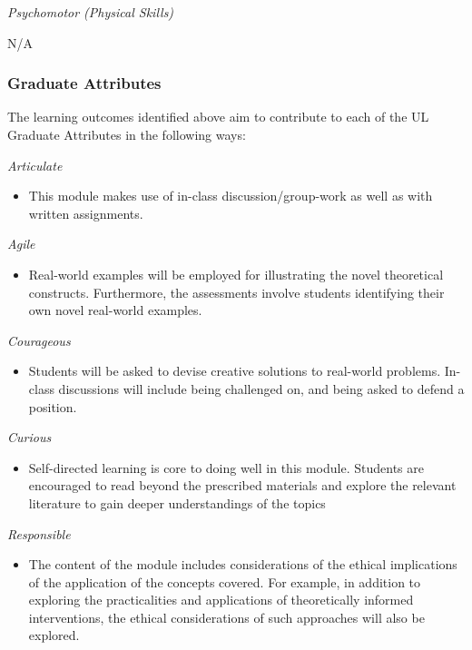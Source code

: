 \documentclass[
  x11names]{article}
\providecommand{\tightlist}{%
  \setlength{\itemsep}{0pt}\setlength{\parskip}{0pt}}
\begin{document}
\bigskip

\emph{Psychomotor (Physical Skills)}

N/A

\subsubsection{Graduate Attributes}\label{graduate-attributes}

The learning outcomes identified above aim to contribute to each of the
UL Graduate Attributes in the following ways:

\emph{Articulate}

\begin{itemize}
\tightlist
\item
  This module makes use of in-class discussion/group-work as well as
  with written assignments.
\end{itemize}

\emph{Agile}

\begin{itemize}
\tightlist
\item
  Real-world examples will be employed for illustrating the novel
  theoretical constructs. Furthermore, the assessments involve students
  identifying their own novel real-world examples.
\end{itemize}

\emph{Courageous}

\begin{itemize}
\tightlist
\item
  Students will be asked to devise creative solutions to real-world
  problems. In-class discussions will include being challenged on, and
  being asked to defend a position.
\end{itemize}

\emph{Curious}

\begin{itemize}
\tightlist
\item
  Self-directed learning is core to doing well in this module. Students
  are encouraged to read beyond the prescribed materials and explore the
  relevant literature to gain deeper understandings of the topics
\end{itemize}

\emph{Responsible}

\begin{itemize}
\tightlist
\item
  The content of the module includes considerations of the ethical
  implications of the application of the concepts covered. For example,
  in addition to exploring the practicalities and applications of
  theoretically informed interventions, the ethical considerations of
  such approaches will also be explored.
\end{itemize}
\end{document}
